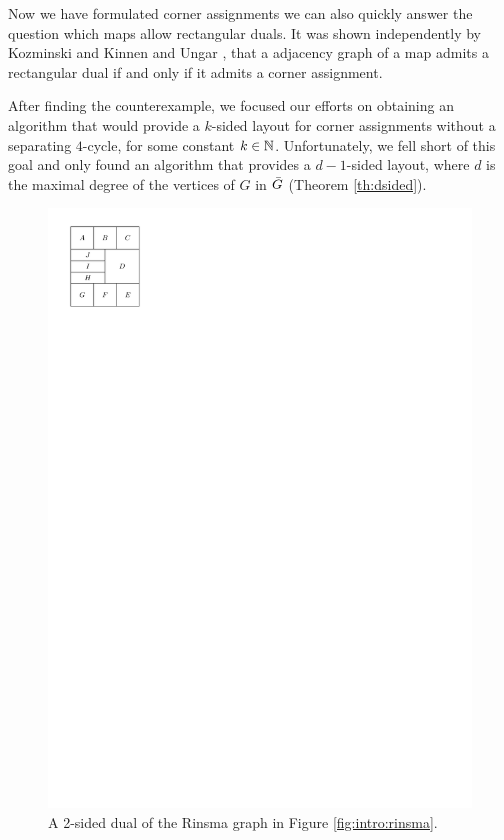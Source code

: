   Now we have formulated corner assignments we can also quickly answer the question which maps allow rectangular duals. It was shown independently by Kozminski and Kinnen \cite{Kozminski1984} and Ungar \cite{Ungar1953}, that a adjacency graph of a map admits a rectangular dual if and only if it admits a corner assignment.

  After finding the counterexample, we focused our efforts on obtaining an algorithm that would provide a $k$-sided layout for corner assignments without a separating $4$-cycle, for some constant $k \in \mathbb{N}$.
  Unfortunately, we fell short of this goal and only found an algorithm that provides a $d-1$-sided layout, where $d$ is the maximal degree of the vertices of $G$ in $\bar{G}$ (Theorem \ref{th:dsided}).

  \newpage
  \begin{figure}
    \centering
    \includegraphics[]{introduction/img/rinsma2Sided.pdf}
    \caption{A 2-sided dual of the Rinsma graph in Figure \ref{fig:intro:rinsma}.}
    \label{fig:intro:rinsma2Sided}
  \end{figure}

